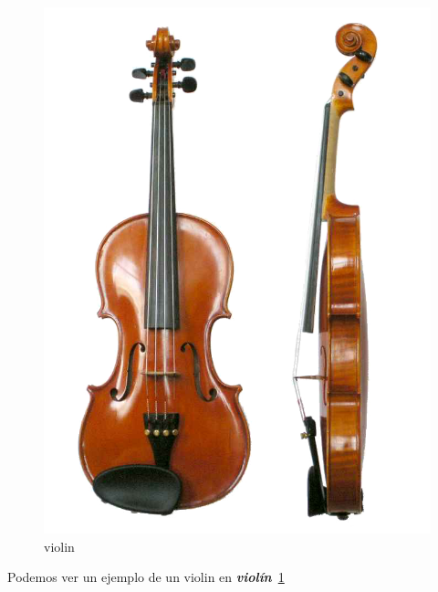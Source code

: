 \begin{figure}[h]
  \centering
  \includegraphics[scale=0.5]{img/22.png}
  \caption {violin}
  \label{fig:violin}
\end{figure}

Podemos ver un ejemplo de un violin en
\emph{\textbf {violín}}~\ref{fig:violin}
